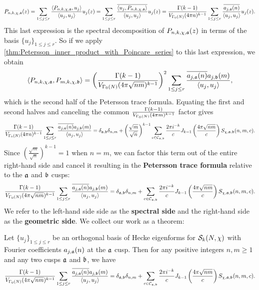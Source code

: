     \[
      P_{n,k,\chi,\mathfrak{a}}(z) = \sum_{1 \le j \le r}\frac{\langle P_{n,k,\chi,\mathfrak{a}},u_{j}\rangle}{\langle u_{j},u_{j}\rangle}u_{j}(z) = \sum_{1 \le j \le r}\frac{\overline{\langle u_{j},P_{n,k,\chi,\mathfrak{a}}\rangle}}{\langle u_{j},u_{j}\rangle}u_{j}(z) = \frac{\Gamma(k-1)}{V_{\Gamma_{0}(N)}(4\pi n)^{k-1}}\sum_{1 \le j \le r}\frac{\overline{a_{j,\mathfrak{a}}(n)}}{\langle u_{j},u_{j}\rangle}u_{j}(z).
    \]
    This last expression is the spectral decomposition of $P_{n,k,\chi,\mathfrak{a}}(z)$ in terms of the basis $\{u_{j}\}_{1 \le j \le r}$. So if we apply \cref{thm:Petersson_inner_product_with_Poincare_series} to this last expression, we obtain
    \[
      \langle P_{n,k,\chi,\mathfrak{a}},P_{m,k,\chi,\mathfrak{b}}\rangle = \left(\frac{\Gamma(k-1)}{V_{\Gamma_{0}(N)}(4\pi \sqrt{nm})^{k-1}}\right)^{2}\sum_{1 \le j \le r}\frac{\overline{a_{j,\mathfrak{a}}(n)}a_{j,\mathfrak{b}}(m)}{\langle u_{j},u_{j}\rangle},
    \]
    which is the second half of the Petersson trace formula. Equating the first and second halves and canceling the common $\frac{\Gamma(k-1)}{V_{\Gamma_{0}(N)}(4\pi m)^{k-1}}$ factor gives
    \[
      \frac{\Gamma(k-1)}{V_{\Gamma_{0}(N)}(4\pi n)^{k-1}}\sum_{1 \le j \le r}\frac{\overline{a_{j,\mathfrak{a}}(n)}a_{j,\mathfrak{b}}(m)}{\langle u_{j},u_{j}\rangle} = \delta_{\mathfrak{a},\mathfrak{b}}\delta_{n,m}+\left(\frac{\sqrt{m}}{\sqrt{n}}\right)^{k-1}\sum_{c \in \mathcal{C}_{\mathfrak{a},\mathfrak{b}}}\frac{2\pi i^{-k}}{c}J_{k-1}\left(\frac{4\pi\sqrt{nm}}{c}\right)S_{\chi,\mathfrak{a},\mathfrak{b}}(n,m,c).
    \]
    Since $\left(\frac{\sqrt{m}}{\sqrt{n}}\right)^{k-1} = 1$ when $n = m$, we can factor this term out of the entire right-hand side and cancel it resulting in the \textbf{Petersson trace formula} relative to the $\mathfrak{a}$ and $\mathfrak{b}$ cusps:
    \[
      \frac{\Gamma(k-1)}{V_{\Gamma_{0}(N)}(4\pi \sqrt{nm})^{k-1}}\sum_{1 \le j \le r}\frac{\overline{a_{j,\mathfrak{a}}(n)}a_{j,\mathfrak{b}}(m)}{\langle u_{j},u_{j}\rangle} = \delta_{\mathfrak{a},\mathfrak{b}}\delta_{n,m}+\sum_{c \in \mathcal{C}_{\mathfrak{a},\mathfrak{b}}}\frac{2\pi i^{-k}}{c}J_{k-1}\left(\frac{4\pi\sqrt{nm}}{c}\right)S_{\chi,\mathfrak{a},\mathfrak{b}}(n,m,c).
    \]
    We refer to the left-hand side side as the \textbf{spectral side} and the right-hand side as the \textbf{geometric side}. We collect our work as a theorem:

    \begin{theorem}
      Let $\{u_{j}\}_{1 \le j \le r}$ be an orthogonal basis of Hecke eigenforms for $\mathcal{S}_{k}(N,\chi)$ with Fourier coefficients $a_{j,
      \mathfrak{a}}(n)$ at the $\mathfrak{a}$ cusp. Then for any positive integers $n,m \ge 1$ and any two cusps $\mathfrak{a}$ and $\mathfrak{b}$, we have
      \[
        \frac{\Gamma(k-1)}{V_{\Gamma_{0}(N)}(4\pi \sqrt{nm})^{k-1}}\sum_{1 \le j \le r}\frac{\overline{a_{j,\mathfrak{a}}(n)}a_{j,\mathfrak{b}}(m)}{\langle u_{j},u_{j}\rangle} = \delta_{\mathfrak{a},\mathfrak{b}}\delta_{n,m}+\sum_{c \in \mathcal{C}_{\mathfrak{a},\mathfrak{b}}}\frac{2\pi i^{-k}}{c}J_{k-1}\left(\frac{4\pi\sqrt{nm}}{c}\right)S_{\chi,\mathfrak{a},\mathfrak{b}}(n,m,c).
      \]
    \end{theorem}

